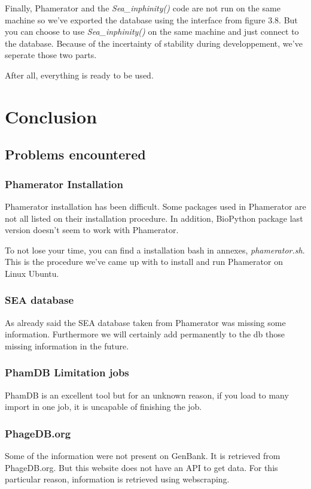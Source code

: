 \documentclass[a4paper,11pt]{report}
\begin{document}
Finally, Phamerator and the \textit{Sea\_inphinity()} code are not run on the same machine so we've exported the database using the interface from figure 3.8. But you can choose to use \textit{Sea\_inphinity()} on the same machine and just connect to the database. Because of the incertainty of stability during developpement, we've seperate those two parts.

After all, everything is ready to be used.

\chapter{Conclusion}
\section{Problems encountered}
\subsection{Phamerator Installation}
Phamerator installation has been difficult. Some packages used in Phamerator are not all listed on their installation procedure. In addition, BioPython package last version doesn't seem to work with Phamerator.

To not lose your time, you can find a installation bash in annexes, \textit{phamerator.sh}. This is the procedure we've came up with to install and run Phamerator on Linux Ubuntu.

\subsection{SEA database}
As already said the SEA database taken from Phamerator was missing some information. Furthermore we will certainly add permanently to the db those missing information in the future.

\subsection{PhamDB Limitation jobs}
PhamDB is an excellent tool but for an unknown reason, if you load to many import in one job, it is uncapable of finishing the job.

\subsection{PhageDB.org}
Some of the information were not present on GenBank. It is retrieved from PhageDB.org. But this website does not have an API to get data. For this particular reason, information is retrieved using webscraping.
\end{document}
